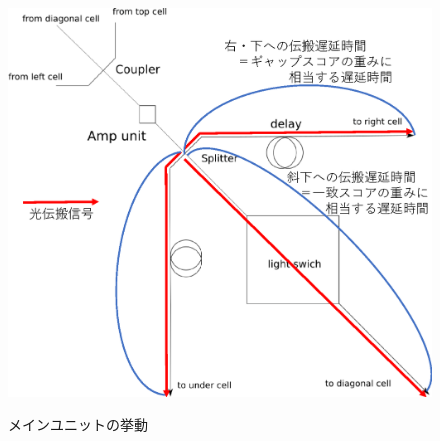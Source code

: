 \begin{itemize}
\begin{figure}[t!]
\begin{center}
{\includegraphics[keepaspectratio,scale=0.4]{fig/3/lightracelogic_cell_6_4.eps}}
\caption{メインユニットの挙動}
\label{fig:mainunit}
\end{center}
\end{figure}

\end{itemize}
